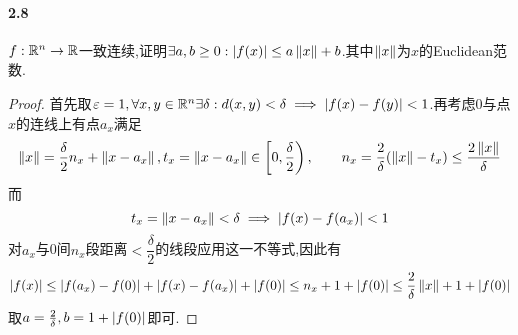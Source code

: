 \documentclass[UTF8]{article}
\begin{document}
\paragraph*{2.8}$f:\mathbb{R}^n\to \mathbb{R}$一致连续,证明$\exists a,b\geq 0:\left|f(x)\right|\leq a\left\|x\right\|+b$.其中$\left\|x\right\|$为$x$的Euclidean范数.
\begin{proof}
    首先取$\varepsilon=1,\forall x,y\in \mathbb{R}^n \exists \delta:d(x,y)<\delta\implies \left|f(x)-f(y)\right|<1$.再考虑0与点$x$的连线上有点$a_x$满足$$\left\|x\right\|=\frac{\delta}{2}n_x+\left\|x-a_x\right\|, t_x=\left\|x-a_x\right\|\in \left[0,\frac{\delta}{2}\right),\qquad n_x=\frac{2}{\delta}(\left\|x\right\|-t_x)\leq \frac{2\left\|x\right\|}{\delta}$$
    而$$t_x=\left\|x-a_x\right\|<\delta\implies \left|f(x)-f(a_x)\right|<1$$
    对$a_x$与0间$n_x$段距离$<\dfrac{\delta}{2}$的线段应用这一不等式,因此有$$|f(x)|\leq \left|f(a_x)-f(0)\right|+\left|f(x)-f(a_x)\right|+\left|f(0)\right|\leq n_x+1+|f(0)|\leq \frac{2}{\delta}\left\|x\right\|+1+\left|f(0)\right|$$
    取$ a=\frac{2}{\delta},b=1+\left|f(0)\right|$即可.
\end{proof}
\end{document}
